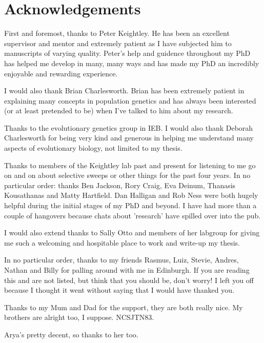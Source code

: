 \chapter{Acknowledgements}

First and foremost, thanks to Peter Keightley. He has been an excellent supervisor and mentor and extremely patient as I have subjected him to manuscripts of varying quality. Peter's help and guidence throughout my PhD has helped me develop in many, many ways and has made my PhD an incredibly enjoyable and rewarding experience.

I would also thank Brian Charlesworth. Brian has been extremely patient in explaining many concepts in population genetics and has always been interested (or at least pretended to be) when I've talked to him about my research.

Thanks to the evolutionary genetics group in IEB. I would also thank Deborah Charlesworth for being very kind and generous in helping me understand many aspects of evolutionary biology, not limited to my thesis.

Thanks to members of the Keightley lab past and present for listening to me go on and on about selective sweeps or other things for the past four years. In no particular order: thanks Ben Jackson, Rory Craig, Eva Deinum, Thanasis Kousathanas and Matty Hartfield. Dan Halligan and Rob Ness were both hugely helpful during the initial stages of my PhD and beyond. I have had more than a couple of hangovers because chats about 'research' have spilled over into the pub.

I would also extend thanks to Sally Otto and members of her labgroup for giving me such a welcoming and hospitable place to work and write-up my thesis.

In no particular order, thanks to my friends Rasmus, Luiz, Stevie, Andres, Nathan and Billy for palling around with me in Edinburgh. If you are reading this and are not listed, but think that you should be, don't worry! I left you off because I thought it went without saying that I would have thanked you.

Thanks to my Mum and Dad for the support, they are both really nice. My brothers are alright too, I suppose. NCSJTN83.

Arya's pretty decent, so thanks to her too.